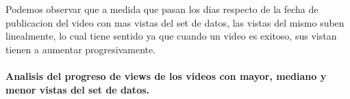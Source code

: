             \begin{figure}[ht]
            \end{figure}
        \FloatBarrier
        Podemos observar que a medida que pasan los dias respecto de la fecha de
        publicacion del video con mas vistas del set de datos, las vistas del
        mismo suben linealmente, lo cual tiene sentido ya que cuando un video
        es exitoso, sus vistan tienen a aumentar progresivamente.

        \newpage
        \paragraph{Analisis del progreso de views de los videos con mayor, mediano y menor vistas del set de datos.}

